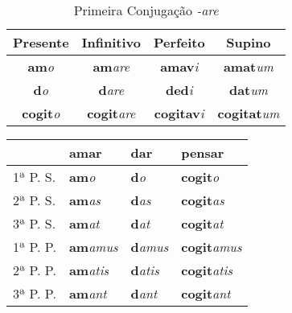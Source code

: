 \documentclass{book}
\newcommand{\radicaldesinencia}[2]{\textbf{#1}\textit{#2}}
\begin{document}

\begin{table}
\centering
\caption{Primeira Conjugação  \textit{-are}}
\vspace{0.2cm}
\begin{tabular}{c|c|c|c}
\hline
Presente		&	Infinitivo		&	Perfeito		&	Supino	\\
\hline                                    		
\radicaldesinencia{am}{o}	&	\radicaldesinencia{am}{are}	&	\radicaldesinencia{amav}{i}	&	\radicaldesinencia{amat}{um}	\\
\radicaldesinencia{d}{o}	&	\radicaldesinencia{d}{are}	&	\radicaldesinencia{ded}{i}	&	\radicaldesinencia{dat}{um}	\\
\radicaldesinencia{cogit}{o}	&	\radicaldesinencia{cogit}{are}	&	\radicaldesinencia{cogitav}{i}	&	\radicaldesinencia{cogitat}{um}	\\
 \hline
\end{tabular}
\end{table}

\begin{table}
\centering
\begin{tabular}{l|l|l|l}
\hline
	&  amar		& dar		& pensar \\
\hline
1ª P. S.	&  \radicaldesinencia{am}{o}		& \radicaldesinencia{d}{o}		& \radicaldesinencia{cogit}{o} \\
2ª P. S.	&  \radicaldesinencia{am}{as} 	& \radicaldesinencia{d}{as}		& \radicaldesinencia{cogit}{as} \\
3ª P. S.	&  \radicaldesinencia{am}{at} 	& \radicaldesinencia{d}{at}		& \radicaldesinencia{cogit}{at} \\
\hline
\hline
1ª P. P.	&  \radicaldesinencia{am}{amus} 	& \radicaldesinencia{d}{amus}	& \radicaldesinencia{cogit}{amus} \\
2ª P. P. 	&  \radicaldesinencia{am}{atis} 	& \radicaldesinencia{d}{atis} 	& \radicaldesinencia{cogit}{atis} \\
3ª P. P.	&  \radicaldesinencia{am}{ant} 	& \radicaldesinencia{d}{ant}		& \radicaldesinencia{cogit}{ant} \\ 
\hline
\end{tabular}
\end{table}
\clearpage
\end{document}
